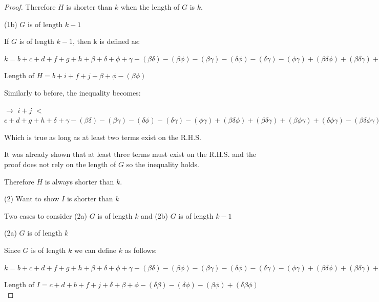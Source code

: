 \documentclass[manuscript]{acmart}
\begin{document}
\begin{proof}
        Therefore $H$ is shorter than $k$ when the length of $G$ is $k$.

        (1b) $G$ is of length $k - 1$

        If $G$ is of length $k - 1$, then k is defined as:

        $k = b + c + d + f + g + h
            + \beta + \delta + \phi + \gamma
            - (\beta \delta) - (\beta \phi) - (\beta \gamma) - (\delta \phi) - (\delta \gamma) -(\phi \gamma)
            + (\beta \delta \phi) + (\beta \delta \gamma) + (\beta \phi \gamma) + (\delta \phi \gamma)
            - (\beta \delta \phi \gamma)
            + 1
        $

        Length of $H = b + i + f + j + \beta + \phi - (\beta \phi)$

        Similarly to before, the inequality becomes:

        $\rightarrow$
        $i + j$
        $<$
        $c + d + g + h
            + \delta + \gamma
            - (\beta \delta) - (\beta \gamma) - (\delta \phi) - (\delta \gamma) -(\phi \gamma)
            + (\beta \delta \phi) + (\beta \delta \gamma) + (\beta \phi \gamma) + (\delta \phi \gamma)
            - (\beta \delta \phi \gamma)
            + 1
            $

        Which is true as long as at least two terms exist on the R.H.S.

        It was already shown that at least three terms must exist on the R.H.S. and the proof does not rely on the length of $G$ so the inequality holds.

        Therefore $H$ is always shorter than $k$. 

        (2) Want to show $I$ is shorter than $k$

        Two cases to consider (2a) $G$ is of length $k$ and (2b) $G$ is of length $k - 1$

        (2a) $G$ is of length $k$

        Since $G$ is of length $k$ we can define $k$ as follows:

        $k = b + c + d + f + g + h
            + \beta + \delta + \phi + \gamma
            - (\beta \delta) - (\beta \phi) - (\beta \gamma) - (\delta \phi) - (\delta \gamma) -(\phi \gamma)
            + (\beta \delta \phi) + (\beta \delta \gamma) + (\beta \phi \gamma) + (\delta \phi \gamma)
            - (\beta \delta \phi \gamma)
        $

        Length of $I = c + d + b + f + j
        + \delta + \beta + \phi
        - (\delta \beta) - (\delta \phi) - (\beta \phi)
        + (\delta \beta \phi)
        $


\end{proof}
\end{document}
